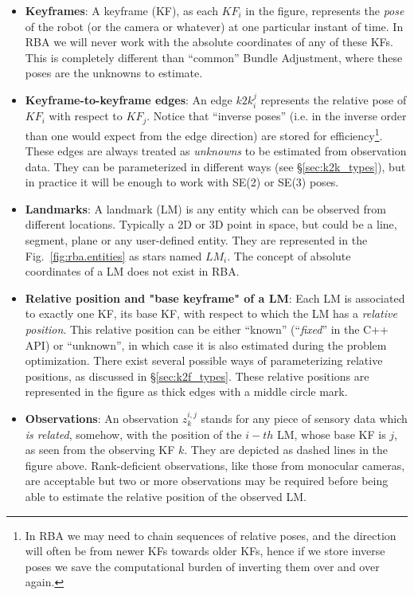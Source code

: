 \documentclass[a4paper,11pt]{article}
\begin{document}
\begin{itemize}
\item{\textbf{Keyframes}: A keyframe (KF), as each $KF_i$ in the figure, represents the \emph{pose} of the robot (or the 
camera or whatever) at one  particular instant of time. In RBA we will never work with the absolute coordinates of any of 
these KFs. This is completely different than ``common'' Bundle Adjustment, where these poses are the unknowns to 
estimate.
}
\item{\textbf{Keyframe-to-keyframe edges}: An edge $k2k_i^j$ represents the relative pose of $KF_i$ with respect to 
$KF_j$. Notice that ``inverse poses'' (i.e. in the inverse order than one would expect from the edge direction) are 
stored for efficiency\footnote{In RBA we may need to chain sequences of relative poses, and the direction will often 
be from newer KFs towards older KFs, hence if we store inverse poses we save the computational burden of inverting them 
over and over again.}. These edges are always treated as \emph{unknowns} to be estimated from observation data.
They can be parameterized in different ways (see \S\ref{sec:k2k_types}), but in practice it will be enough to work 
with SE(2) or SE(3) poses.
}
\item{\textbf{Landmarks}: A landmark (LM) is any entity which can be observed from different locations. Typically a 2D 
or 3D point in space, but could be a line, segment, plane or any user-defined entity. They are represented in 
the Fig.~\ref{fig:rba.entities} as stars named $LM_i$. The concept of absolute coordinates of a LM 
does not exist in RBA.
}
\item{\textbf{Relative position and "base keyframe" of a LM}: Each LM is associated to exactly one KF, its {base KF}, with 
respect to which the LM has a \emph{relative position}. This relative position can be either ``known'' (``\emph{fixed}'' 
in the C++ API) or ``unknown'', in which case it is also estimated during the problem optimization. There exist several 
possible ways of parameterizing relative positions, as discussed in \S\ref{sec:k2f_types}. These relative positions are 
represented in the figure as thick edges with a middle circle mark.
}
\item{\textbf{Observations}: An observation $z^{i,j}_k$ stands for any piece of sensory data which \emph{is related}, 
somehow, with the position of the $i-th$ LM, whose base KF is $j$, as seen from the observing KF $k$. They are 
depicted as dashed lines in the figure above. Rank-deficient observations, like those from monocular cameras, are 
acceptable but two or more observations may be required before being able to estimate the relative position of the 
observed LM.
}
\end{itemize}
\end{document}
